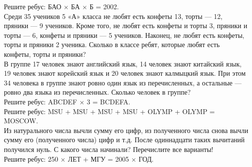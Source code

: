  Решите ребус: БАО $\times$ БА $\times$ Б = 2002.\\


 Среди 35 учеников 5 «А» класса не любят есть конфеты 13, торты —
12, пряники — 9 учеников. Кроме того, не любят есть конфеты и торты 3, пряники и торты — 6,
конфеты и пряники — 5 учеников. Наконец, не любят есть конфеты, торты и пряники 2 ученика.
Сколько в классе ребят, которые любят есть конфеты, торты и пряники?\\


 В группе 17 человек знают английский язык, 14 человек знают
китайский язык, 19 человек знают корейский язык и 20 человек знают калмыцкий язык. При этом
34 человека в группе знают ровно один язык из перечисленных, а остальные — ровно два языка
из перечисленных. Сколько человек в группе?\\


 Решите ребус: ABCDEF $\times$ 3 = BCDEFA.\\


 Решите ребус: MSU + MSU + MSU + MSU + OLYMP + OLYMP = MOSCOW.\\


 Из натурального числа вычли сумму его цифр, из
полученного числа снова вычли сумму его (полученного числа) цифр и т.д. После одиннадцати
таких вычитаний получился нуль. С какого числа начинали? Перечислите все варианты!\\


 Решите ребус: 250 $\times$ ЛЕТ + МГУ = 2005 $\times$ ГОД.



